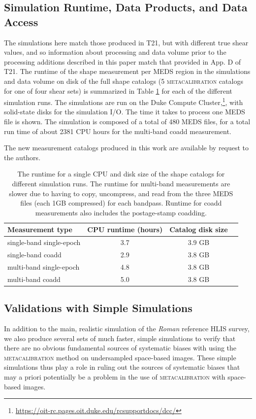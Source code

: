 \documentclass[fleqn,usenatbib]{mnras}
\begin{document}
\subsection{Simulation Runtime, Data Products, and Data Access}
The simulations here match those produced in T21, but with different true shear values, and so information about processing and data volume prior to the processing additions described in this paper match that provided in App. D of T21.
The runtime of the shape measurement per MEDS region in the simulations and data volume on disk of the full shape catalogs (5 \textsc{metacalibration} catalogs for one of four shear sets) is summarized in Table \ref{tab:data} for each of the different simulation runs. The simulations are run on the Duke Compute Cluster,\footnote{\url{https://oit-rc.pages.oit.duke.edu/rcsupportdocs/dcc/}}, with solid-state disks for the simulation I/O. The time it takes to process one MEDS file is shown. The simulation is composed of a total of 480 MEDS files, for a total run time of about 2381 CPU hours for the multi-band coadd measurement.

The new measurement catalogs produced in this work are available by request to the authors.
\begin{table}
    \centering
    \begin{tabular}[width=\columnwidth]{l|c|c|c}
    \hline
    Measurement type &  CPU runtime (hours) & Catalog disk size  \\
    \hline 
    single-band single-epoch  & 3.7 & 3.9 GB \\
    single-band coadd  & 2.9 & 3.8 GB \\
    multi-band single-epoch  & 4.8 & 3.8 GB \\
    multi-band coadd  & 5.0 & 3.8 GB \\
    \hline
    \end{tabular}
    \caption{The runtime for a single CPU and disk size of the shape catalogs for different simulation runs. The runtime for multi-band measurements are slower due to having to copy, uncompress, and read from the three MEDS files (each 1GB compressed) for each bandpass. Runtime for coadd measurements also includes the postage-stamp coadding.}
    \label{tab:data}
\end{table}

\subsection{Validations with Simple Simulations}
\label{subsec:simplesim}
In addition to the main, realistic simulation of the \emph{Roman} reference HLIS survey, we also produce several sets of much faster, simple simulations  to verify that there are no obvious fundamental sources of systematic biases with using the \textsc{metacalibration} method on undersampled space-based images. These simple simulations thus play a role in ruling out the sources of systematic biases that may a priori  potentially be a problem in the use of \textsc{metacalibration} with space-based images. 
\end{document}

